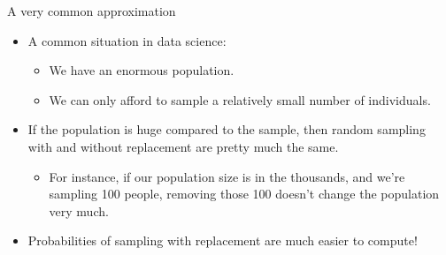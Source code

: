 \documentclass[aspectratio=169]{../latex_main/tntbeamer}  %
\begin{document}
	
	\begin{frame}{A very common approximation}
	    \begin{itemize}
	        \item A common situation in data science:
	        \begin{itemize}
	            \item We have an enormous population.
	            \item We can only afford to sample a relatively small number of individuals.
	        \end{itemize}
	        \item If the population is huge compared to the sample, then random sampling with and without replacement are pretty much the same.
	        \begin{itemize}
	            \item For instance, if our population size is in the thousands, and we’re sampling 100 people, removing those 100 doesn’t change the population very much.
	        \end{itemize}
	        \item Probabilities of sampling with replacement are much easier to compute!
	    \end{itemize}
	\end{frame}
	
\end{document}
